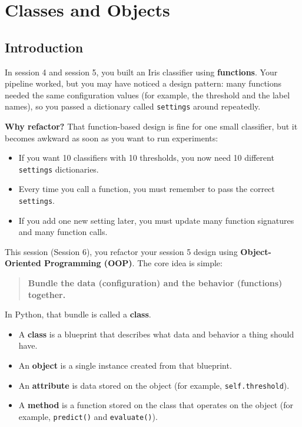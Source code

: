 \chapter{Classes and Objects}

\section{Introduction}
In session 4 and session 5, you built an Iris classifier using \textbf{functions}.
Your pipeline worked, but you may have noticed a design pattern:
many functions needed the same configuration values (for example, the threshold and the label names), so you passed a dictionary called \texttt{settings} around repeatedly.

\noindent
\textbf{Why refactor?}
That function-based design is fine for one small classifier, but it becomes awkward as soon as you want to run experiments:
\begin{itemize}\setlength{\itemsep}{2pt}
    \item If you want 10 classifiers with 10 thresholds, you now need 10 different \texttt{settings} dictionaries.
    \item Every time you call a function, you must remember to pass the correct \texttt{settings}.
    \item If you add one new setting later, you must update many function signatures and many function calls.
\end{itemize}

\noindent
This session (Session 6), you refactor your session 5 design using \textbf{Object-Oriented Programming (OOP)}.
The core idea is simple:
\begin{quote}
\textbf{Bundle the data (configuration) and the behavior (functions) together.}
\end{quote}

\noindent
In Python, that bundle is called a \textbf{class}.
\begin{itemize}\setlength{\itemsep}{2pt}
    \item A \textbf{class} is a blueprint that describes what data and behavior a thing should have.
    \item An \textbf{object} is a single instance created from that blueprint.
    \item An \textbf{attribute} is data stored on the object (for example, \texttt{self.threshold}).
    \item A \textbf{method} is a function stored on the class that operates on the object (for example, \texttt{predict()} and \texttt{evaluate()}).
\end{itemize}


